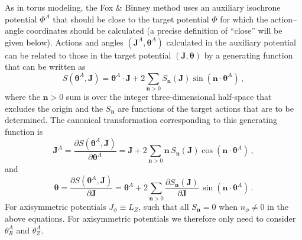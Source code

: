 \documentclass[12pt,preprint]{aastex}
\renewcommand{\vec}[1]{\ensuremath{\mathbf{#1}}}
\newcommand{\vecj}{\ensuremath{\vec{J}}}
\newcommand{\vecn}{\ensuremath{\vec{n}}}
\newcommand{\veca}{\ensuremath{\boldsymbol\theta}}
\begin{document}
As in torus modeling, the Fox \& Binney method uses an auxiliary
isochrone potential $\Phi^A$ that should be close to the target
potential $\Phi$ for which the action--angle coordinates should be
calculated (a precise definition of ``close'' will be given
below). Actions and angles $(\vecj^A,\veca^A)$ calculated in the
auxiliary potential can be related to those in the target potential
$(\vecj,\veca)$ by a generating function that can be written as
\citep{McGill90a}
\begin{equation}
  S(\veca^A,\vecj) = \veca^A\cdot\vecj+2\sum_{\vecn > 0} S_{\vecn}(\vecj)\sin(\vecn\cdot\veca^A)\,,
\end{equation}
where the $\vecn > 0$ sum is over the integer three-dimensional
half-space that excludes the origin and the $S_{\vecn}$ are functions
of the target actions that are to be determined. The canonical
transformation corresponding to this generating function is
\begin{equation}\label{eq:jjt}
  \vecj^A = \frac{\partial S(\veca^A,\vecj)}{\partial \veca^A} = \vecj + 2\sum_{\vecn > 0} \vecn\,S_{\vecn}(\vecj)\cos(\vecn\cdot\veca^A)\,,
\end{equation}
and
\begin{equation}\label{eq:aat}
  \veca = \frac{\partial S(\veca^A,\vecj)}{\partial \vecj} = \veca^A +2\sum_{\vecn > 0} \frac{\partial S_{\vecn}(\vecj)}{\partial \vecj}\,\sin(\vecn\cdot\veca^A)\,.
\end{equation}
For axisymmetric potentials $J_\phi \equiv L_Z$, such that all
$S_\vecn = 0$ when $n_\phi \neq 0 $ in the above equations. For
axisymmetric potentials we therefore only need to consider
$\theta^A_R$ and $\theta^A_Z$.
\end{document}
